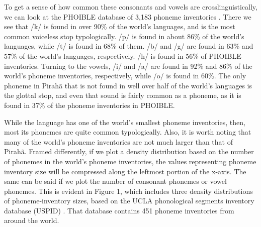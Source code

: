 \documentclass[output=paper,colorlinks,citecolor=brown
]{langscibook}
\begin{document}
    To get a sense of how common these consonants and vowels are crosslinguistically, we can look at the PHOIBLE database of 3,183 phoneme inventories \citep{phoible}. There we see that /k/ is found in over 90\% of the world’s languages, and is the most common voiceless stop typologically. /p/ is found in about 86\% of the world’s languages, while /t/ is found in 68\% of them. /b/ and /g/ are found in 63\% and 57\% of the world’s languages, respectively. /h/ is found in 56\% of PHOIBLE inventories. Turning to the vowels, /i/ and /a/ are found in 92\% and 86\% of the world’s phoneme inventories, respectively, while /o/ is found in 60\%. The only phoneme in Pirahã that is not found in well over half of the world’s languages is the glottal stop, and even that sound is fairly common as a phoneme, as it is found in 37\% of the phoneme inventories in PHOIBLE.

    While the language has one of the world’s smallest phoneme inventories, then, most its phonemes are quite common typologically. Also, it is worth noting that many of the world's phoneme inventories are not much larger than that of Pirahã. Framed differently, if we plot a density distribution based on the number of phonemes in the world’s phoneme inventories, the values representing phoneme inventory size will be compressed along the leftmost portion of the x-axis. The same can be said if we plot the number of consonant phonemes or vowel phonemes. This is evident in Figure 1, which includes three density distributions of phoneme-inventory sizes, based on the UCLA phonological segments inventory database (USPID) \citep{maddieson1989updating}. That database contains 451 phoneme inventories from around the world.
\end{document}
